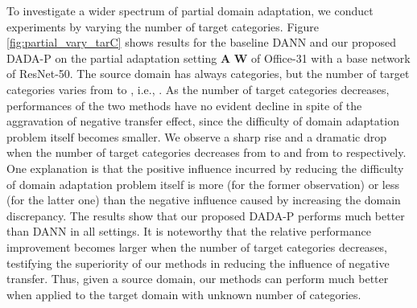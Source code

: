 \documentclass[letterpaper]{article} \usepackage{aaai20}  \usepackage{times}  \usepackage{helvet} \usepackage{courier}  \usepackage[hyphens]{url}  \usepackage{graphicx} \urlstyle{rm} \def\UrlFont{\rm}  \usepackage{graphicx}  \frenchspacing  \setlength{\pdfpagewidth}{8.5in}  \setlength{\pdfpageheight}{11in}
\begin{document}
To investigate a wider spectrum of partial domain adaptation, we conduct experiments by varying the number of target categories. Figure \ref{fig:partial_vary_tarC} shows results for the baseline DANN \cite{dann} and our proposed DADA-P on the partial adaptation setting \textbf{A}  \textbf{W} of Office-31 with a base network of ResNet-50.  The source domain has always  categories, but the number of target categories varies from  to , i.e., . As the number of target categories decreases, performances of the two methods have no evident decline in spite of the aggravation of negative transfer effect, since the difficulty of domain adaptation problem itself becomes smaller. We observe a sharp rise and a dramatic drop when the number of target categories decreases from  to  and from  to  respectively. One explanation is that the positive influence incurred by reducing the difficulty of domain adaptation problem itself is more (for the former observation) or less (for the latter one) than the negative influence caused by increasing the domain discrepancy. The results show that our proposed DADA-P performs much better than DANN in all settings. It is noteworthy that the relative performance improvement becomes larger when the number of target categories decreases, testifying the superiority of our methods in reducing the influence of negative transfer. Thus, given a source domain, our methods can perform much better when applied to the target domain with unknown number of categories.
\end{document}
